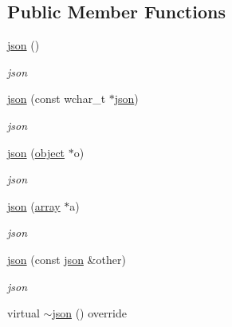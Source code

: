 \subsection*{Public Member Functions}
\begin{DoxyCompactItemize}
\item 
\hyperlink{classformat_1_1json_a076a6ac427f4c24ce8615e0d86f3bf72}{json} ()\hypertarget{classformat_1_1json_a076a6ac427f4c24ce8615e0d86f3bf72}{}\label{classformat_1_1json_a076a6ac427f4c24ce8615e0d86f3bf72}

\begin{DoxyCompactList}\small\item\em json \end{DoxyCompactList}\item 
\hyperlink{classformat_1_1json_a68e9a5bd2797f98f769f327840f30102}{json} (const wchar\+\_\+t $\ast$\hyperlink{classformat_1_1json}{json})
\begin{DoxyCompactList}\small\item\em json \end{DoxyCompactList}\item 
\hyperlink{classformat_1_1json_aeb56e34d244caf2e4a05d9133b938ab0}{json} (\hyperlink{classformat_1_1object}{object} $\ast$o)
\begin{DoxyCompactList}\small\item\em json \end{DoxyCompactList}\item 
\hyperlink{classformat_1_1json_afc70965bc62c2d30bba3bea65da83032}{json} (\hyperlink{classformat_1_1array}{array} $\ast$a)
\begin{DoxyCompactList}\small\item\em json \end{DoxyCompactList}\item 
\hyperlink{classformat_1_1json_a6d5df3e615981da43a79744ff6c6df00}{json} (const \hyperlink{classformat_1_1json}{json} \&other)
\begin{DoxyCompactList}\small\item\em json \end{DoxyCompactList}\item 
virtual \hyperlink{classformat_1_1json_abd5dba4e20afebd5677e935f5f56c14e}{$\sim$json} () override\hypertarget{classformat_1_1json_abd5dba4e20afebd5677e935f5f56c14e}{}\label{classformat_1_1json_abd5dba4e20afebd5677e935f5f56c14e}


\end{DoxyCompactItemize}
